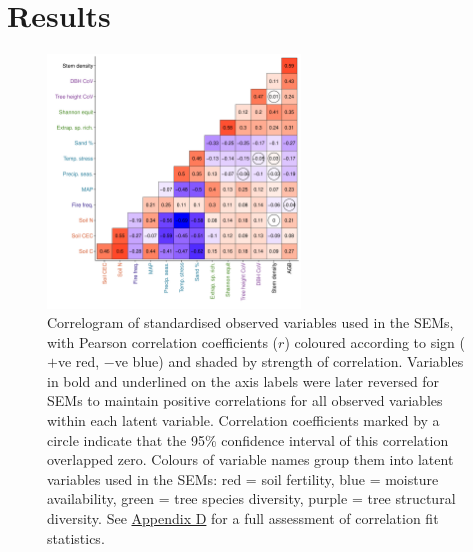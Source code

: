 \documentclass[11pt,a4paper]{article}
\begin{document}

\section*{Results}

\begin{figure}[H]
\centering
	\includegraphics[width=0.6\textwidth]{corr_mat}
	\caption{Correlogram of standardised observed variables used in the SEMs, with Pearson correlation coefficients ($r$) coloured according to sign ($+$ve red, $-$ve blue) and shaded by strength of correlation. Variables in bold and underlined on the axis labels were later reversed for SEMs to maintain positive correlations for all observed variables within each latent variable. Correlation coefficients marked by a circle indicate that the 95\% confidence interval of this correlation overlapped zero. Colours of variable names group them into latent variables used in the SEMs: red = soil fertility, blue = moisture availability, green = tree species diversity, purple = tree structural diversity. See \hyperref[appendixd]{Appendix D} for a full assessment of correlation fit statistics.}
	\label{corr_mat}
\end{figure}
\end{document}
